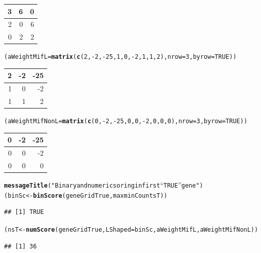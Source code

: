\documentclass[a4paper,10pt]{article}\usepackage[]{graphicx}\usepackage[]{xcolor}
\makeatletter
\newcommand{\hlnum}[1]{\textcolor[rgb]{0.686,0.059,0.569}{#1}}%
\newcommand{\hlstr}[1]{\textcolor[rgb]{0.192,0.494,0.8}{#1}}%
\newcommand{\hlopt}[1]{\textcolor[rgb]{0,0,0}{#1}}%
\newcommand{\hlstd}[1]{\textcolor[rgb]{0.345,0.345,0.345}{#1}}%
\newcommand{\hlkwb}[1]{\textcolor[rgb]{0.69,0.353,0.396}{#1}}%
\newcommand{\hlkwc}[1]{\textcolor[rgb]{0.333,0.667,0.333}{#1}}%
\newcommand{\hlkwd}[1]{\textcolor[rgb]{0.737,0.353,0.396}{\textbf{#1}}}%
\newenvironment{kframe}{%
 \def\at@end@of@kframe{}%
 \ifinner\ifhmode%
  \def\at@end@of@kframe{\end{minipage}}%
  \begin{minipage}{\columnwidth}%
 \fi\fi%
 \def\FrameCommand##1{\hskip\@totalleftmargin \hskip-\fboxsep
 \colorbox{shadecolor}{##1}\hskip-\fboxsep
     \hskip-\linewidth \hskip-\@totalleftmargin \hskip\columnwidth}%
 \MakeFramed {\advance\hsize-\width
   \@totalleftmargin\z@ \linewidth\hsize
   \@setminipage}}%
 {\par\unskip\endMakeFramed%
 \at@end@of@kframe}
\newenvironment{knitrout}{}{} %
\makeatother
\begin{document}
\begin{knitrout}
\begin{tabular}{r|r|r}
\hline
3 & 6 & 0\\
\hline
2 & 0 & 6\\
\hline
0 & 2 & 2\\
\hline
\end{tabular}\begin{kframe}\begin{alltt}
\hlstd{(aWeightMifL}\hlkwb{=}\hlkwd{matrix} \hlstd{(}\hlkwd{c}\hlstd{(}\hlnum{2}\hlstd{,}\hlopt{-}\hlnum{2}\hlstd{,}\hlopt{-}\hlnum{25}\hlstd{,}\hlnum{1}\hlstd{,}\hlnum{0}\hlstd{,}\hlopt{-}\hlnum{2}\hlstd{,}\hlnum{1}\hlstd{,}\hlnum{1}\hlstd{,}\hlnum{2}\hlstd{),} \hlkwc{nrow}\hlstd{=}\hlnum{3}\hlstd{,} \hlkwc{byrow}\hlstd{=}\hlnum{TRUE}\hlstd{))}
\end{alltt}
\end{kframe}


\begin{tabular}{r|r|r}
\hline
2 & -2 & -25\\
\hline
1 & 0 & -2\\
\hline
1 & 1 & 2\\
\hline
\end{tabular}\begin{kframe}\begin{alltt}
\hlstd{(aWeightMifNonL}\hlkwb{=}\hlkwd{matrix} \hlstd{(}\hlkwd{c}\hlstd{(}\hlnum{0}\hlstd{,}\hlopt{-}\hlnum{2}\hlstd{,}\hlopt{-}\hlnum{25}\hlstd{,}\hlnum{0}\hlstd{,}\hlnum{0}\hlstd{,}\hlopt{-}\hlnum{2}\hlstd{,}\hlnum{0}\hlstd{,}\hlnum{0}\hlstd{,}\hlnum{0}\hlstd{),} \hlkwc{nrow}\hlstd{=}\hlnum{3}\hlstd{,} \hlkwc{byrow}\hlstd{=}\hlnum{TRUE}\hlstd{))}
\end{alltt}
\end{kframe}


\begin{tabular}{r|r|r}
\hline
0 & -2 & -25\\
\hline
0 & 0 & -2\\
\hline
0 & 0 & 0\\
\hline
\end{tabular}\begin{kframe}\begin{alltt}
\hlkwd{messageTitle}\hlstd{(}\hlstr{"Binary and numeric soring in first ``TRUE'' gene"}\hlstd{)}
\hlstd{(binSc}\hlkwb{<-} \hlkwd{binScore} \hlstd{(geneGridTrue, maxminCountsT ))}
\end{alltt}
\begin{verbatim}
## [1] TRUE
\end{verbatim}
\begin{alltt}
\hlstd{(nsT}\hlkwb{<-} \hlkwd{numScore}\hlstd{(geneGridTrue,} \hlkwc{LShaped} \hlstd{= binSc, aWeightMifL, aWeightMifNonL))}
\end{alltt}
\begin{verbatim}
## [1] 36
\end{verbatim}
\end{kframe}
\end{knitrout}
\end{document}
